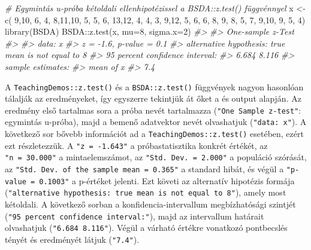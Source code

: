 \documentclass[
]{book}
\newenvironment{Shaded}{\begin{snugshade}}{\end{snugshade}}
\newcommand{\AttributeTok}[1]{\textcolor[rgb]{0.77,0.63,0.00}{#1}}
\newcommand{\CommentTok}[1]{\textcolor[rgb]{0.56,0.35,0.01}{\textit{#1}}}
\newcommand{\DecValTok}[1]{\textcolor[rgb]{0.00,0.00,0.81}{#1}}
\newcommand{\FunctionTok}[1]{\textcolor[rgb]{0.00,0.00,0.00}{#1}}
\newcommand{\NormalTok}[1]{#1}
\newcommand{\OtherTok}[1]{\textcolor[rgb]{0.56,0.35,0.01}{#1}}
\newcommand{\SpecialCharTok}[1]{\textcolor[rgb]{0.00,0.00,0.00}{#1}}
\begin{document}
\begin{Shaded}
\begin{Highlighting}[]
\CommentTok{\# Egymintás u{-}próba kétoldali ellenhipotézissel a BSDA::z.test() függvénnyel}
\NormalTok{x }\OtherTok{\textless{}{-}} \FunctionTok{c}\NormalTok{( }\DecValTok{9}\NormalTok{,}\DecValTok{10}\NormalTok{, }\DecValTok{6}\NormalTok{, }\DecValTok{4}\NormalTok{, }\DecValTok{8}\NormalTok{,}\DecValTok{11}\NormalTok{,}\DecValTok{10}\NormalTok{, }\DecValTok{5}\NormalTok{, }\DecValTok{5}\NormalTok{, }\DecValTok{6}\NormalTok{,}
       \DecValTok{13}\NormalTok{,}\DecValTok{12}\NormalTok{, }\DecValTok{4}\NormalTok{, }\DecValTok{4}\NormalTok{, }\DecValTok{3}\NormalTok{, }\DecValTok{9}\NormalTok{,}\DecValTok{12}\NormalTok{, }\DecValTok{5}\NormalTok{, }\DecValTok{6}\NormalTok{, }\DecValTok{6}\NormalTok{,}
        \DecValTok{8}\NormalTok{, }\DecValTok{9}\NormalTok{, }\DecValTok{8}\NormalTok{, }\DecValTok{5}\NormalTok{, }\DecValTok{7}\NormalTok{, }\DecValTok{9}\NormalTok{,}\DecValTok{10}\NormalTok{, }\DecValTok{9}\NormalTok{, }\DecValTok{5}\NormalTok{, }\DecValTok{4}\NormalTok{)}
\FunctionTok{library}\NormalTok{(BSDA)}
\NormalTok{BSDA}\SpecialCharTok{::}\FunctionTok{z.test}\NormalTok{(x, }\AttributeTok{mu=}\DecValTok{8}\NormalTok{, }\AttributeTok{sigma.x=}\DecValTok{2}\NormalTok{)  }
\CommentTok{\#\textgreater{} }
\CommentTok{\#\textgreater{}  One{-}sample z{-}Test}
\CommentTok{\#\textgreater{} }
\CommentTok{\#\textgreater{} data:  x}
\CommentTok{\#\textgreater{} z = {-}1.6, p{-}value = 0.1}
\CommentTok{\#\textgreater{} alternative hypothesis: true mean is not equal to 8}
\CommentTok{\#\textgreater{} 95 percent confidence interval:}
\CommentTok{\#\textgreater{}  6.684 8.116}
\CommentTok{\#\textgreater{} sample estimates:}
\CommentTok{\#\textgreater{} mean of x }
\CommentTok{\#\textgreater{}       7.4}
\end{Highlighting}
\end{Shaded}

A \texttt{TeachingDemos::z.test()} és a \texttt{BSDA::z.test()} függvények nagyon hasonlóan tálalják az eredményeket, így egyszerre tekintjük át őket a és output alapján. Az eredmény első tartalmas sora a próba nevét tartalmazza (\texttt{"One\ Sample\ z-test"}: egymintás u-próba), majd a bemenő adatvektor nevét olvashatjuk (\texttt{"data:\ x"}). A következő sor bővebb információt ad a \texttt{TeachingDemos::z.test()} esetében, ezért ezt részletezzük. A \texttt{"z\ =\ -1.643"} a próbastatisztika konkrét értékét, az \texttt{"n\ =\ 30.000"} a mintaelemszámot, az \texttt{"Std.\ Dev.\ =\ 2.000"} a populáció szórását, az \texttt{"Std.\ Dev.\ of\ the\ sample\ mean\ =\ 0.365"} a standard hibát, és végül a \texttt{"p-value\ =\ 0.1003"} a p-értéket jelenti. Ezt követi az alternatív hipotézis formája (\texttt{"alternative\ hypothesis:\ true\ mean\ is\ not\ equal\ to\ 8"}), amely most kétoldali. A következő sorban a konfidencia-intervallum megbízhatósági szintjét (\texttt{"95\ percent\ confidence\ interval:"}), majd az intervallum határait olvashatjuk (\texttt{"6.684\ 8.116"}). Végül a várható értékre vonatkozó pontbecslés tényét és eredményét látjuk (\texttt{"7.4"}).
\end{document}

